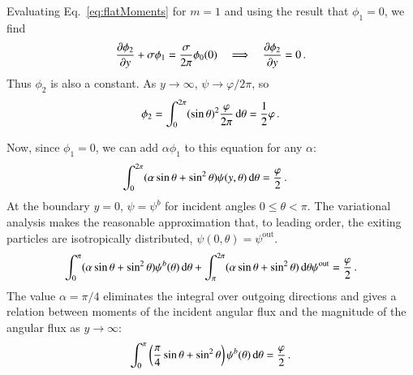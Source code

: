 \documentclass{anstrans}
\begin{document}
Evaluating Eq.~\eqref{eq:flatMoments} for $m=1$ and using the result that
$\phi_{1}=0$, we find
\begin{equation*}
  \frac{\partial \phi_{2}}{\partial y}
  + \sigma \phi_{1}
  = \frac{\sigma}{2\pi} \phi_{0} (0)
  \quad \Longrightarrow \quad
  \frac{\partial \phi_{2}}{\partial y} = 0\,.
\end{equation*}
Thus $\phi_{2}$ is also a constant. As $y\to\infty$, $\psi\to\varphi/2\pi$, so
\begin{equation*}
  \phi_{2} = \int_{0}^{2\pi} (\sin\theta)^2 \frac{\varphi}{2\pi} \mathop{}\!\mathrm{d}\theta
  = \frac{1}{2} \varphi\,.
\end{equation*}

Now, since $\phi_1=0$, we can add $\alpha \phi_1$ to this equation for any
$\alpha$:
\begin{align*}
 \int_{0}^{2\pi} (\alpha \sin\theta + \sin^2\theta)
 \psi(y,\theta) \mathop{}\!\mathrm{d}\theta
 &= \frac{\varphi}{2}\,.
\end{align*}
At the boundary $y=0$, $\psi=\psi^b$ for incident angles $0 \le \theta < \pi$. The
variational analysis makes the reasonable approximation that, to leading order,
the exiting particles are isotropically distributed, $\psi(0,\theta)=\psi^\text{out}$.
\begin{equation*}
 \int_{0}^{\pi} (\alpha \sin\theta + \sin^2\theta)
 \psi^b(\theta) \mathop{}\!\mathrm{d}\theta
 + \int_{\pi}^{2\pi} (\alpha \sin\theta + \sin^2\theta)\mathop{}\!\mathrm{d}\theta \psi^\text{out}
 = \frac{\varphi}{2}\,.
\end{equation*}
The value $\alpha=\pi/4$ eliminates the integral over outgoing directions and
gives a relation between moments of the incident angular flux and the
magnitude of the angular flux as $y\to\infty$:
\begin{equation}\label{eq:varBoundary}
  \int_{0}^{\pi} \left( \frac{\pi}{4} \sin\theta + \sin^2\theta \right)
 \psi^b(\theta) \mathop{}\!\mathrm{d}\theta
 = \frac{\varphi}{2}\,.
\end{equation}
\end{document}
